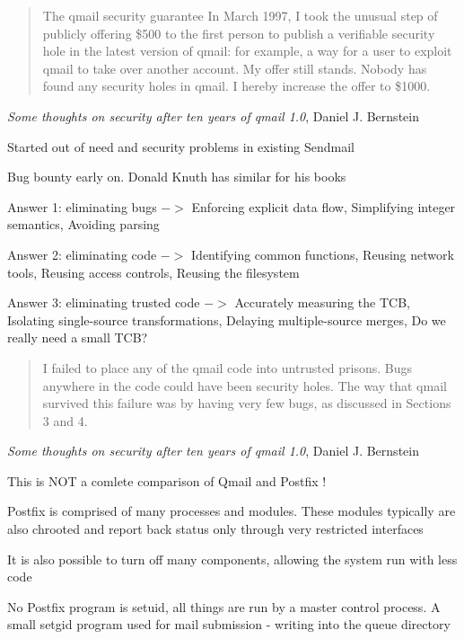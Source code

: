 \documentclass[Screen16to9,17pt]{foils}
\begin{document}

\begin{quote}
The qmail security guarantee
In March 1997, I took the unusual step of publicly offering
\$500 to the first person to publish a verifiable security hole
in the latest version of qmail: for example, a way for a user
to exploit qmail to take over another account. My offer still
stands. Nobody has found any security holes in qmail. I
hereby increase the offer to \$1000.
\end{quote}
\emph{Some thoughts on security after ten years of qmail 1.0},
Daniel J. Bernstein

\begin{list2}
\item Started out of need and security problems in existing Sendmail
\item Bug bounty early on. Donald Knuth has similar for his books
\end{list2}


\begin{list2}
\item Answer 1: eliminating bugs $->$ Enforcing explicit data flow, Simplifying integer semantics, Avoiding parsing
\item Answer 2: eliminating code  $->$ Identifying common functions, Reusing network tools, Reusing access controls, Reusing the filesystem
\item Answer 3: eliminating trusted code $->$ Accurately measuring the TCB, Isolating single-source transformations, Delaying multiple-source merges, Do we really need a small TCB?
\end{list2}


\begin{quote}
I failed to place any of the qmail code into untrusted prisons. Bugs anywhere in the code could have been security holes. The way that qmail survived this failure was by having very few bugs, as discussed in Sections 3 and 4.
\end{quote}
\emph{Some thoughts on security after ten years of qmail 1.0},
Daniel J. Bernstein

\begin{list2}
\item This is NOT a comlete comparison of Qmail and Postfix !
\item Postfix is comprised of many processes and modules. These modules typically are also chrooted and report back status only through very restricted interfaces
\item It is also possible to turn off many components, allowing the system run with less code
\item No Postfix program is setuid, all things are run by a master control process. A small setgid program used for mail submission - writing into the queue directory
\end{list2}
\end{document}
